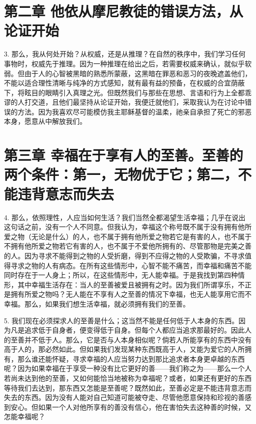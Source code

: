 
\section{第二章 他依从摩尼教徒的错误方法，从论证开始}

3. 那么，我从何处开始？从权威，还是从推理？在自然的秩序中，我们学习任何事物时，权威先于推理。因为一种推理在给出之后，若需要权威来确认，就似乎软弱。但由于人的心智被黑暗的熟悉所蒙蔽，这黑暗在罪恶和恶习的夜晚遮盖他们，不能以适合理性清晰与纯净的方式感知，就有最有益的预备，在权威的合宜荫蔽下，将眩目的眼睛引入真理之光。但既然我们与那些在思想、言语和行为上全都乖谬的人打交道，且他们最坚持从论证开始，我便迁就他们，采取我认为在讨论中错误的方法。因为我喜欢尽可能模仿我主耶稣基督的温柔，祂亲自承担了死亡的邪恶本身，愿意从中解放我们。\par


\section{第三章 幸福在于享有人的至善。至善的两个条件：第一，无物优于它；第二，不能违背意志而失去}

4. 那么，依照理性，人应当如何生活？我们当然全都渴望生活幸福；几乎在说出这句话之前，没有一个人不同意。但我认为，幸福这个称号既不属于没有拥有他所爱之物（无论是什么）的人，也不属于拥有他所爱之物若它是有害的人，也不属于不拥有他所爱之物若它有害的人，也不属于不爱他所拥有的、尽管那物是完美之善的人。因为寻求不能得到之物的人受折磨，得到不应得之物的人受欺骗，不寻求值得寻求之物的人有病态。在所有这些情形中，心智不能不痛苦，而幸福和痛苦不能同时存在于一人身上；所以，在这些情形中，无人能幸福。于是我找到第四种情形，其中幸福生活存在：当人的至善被爱且被拥有之时。因为我们所谓享乐，不正是拥有所爱之物吗？无人能在不享有人之至善的情况下幸福，也无人能享用它而不幸福。那么，如果我们想生活幸福，就必须拥有我们的至善。\par

5. 我们现在必须探求人的至善是什么；这当然不能是任何低于人本身的东西。因为凡是追求低于自身者，便变得低于自身。但每个人都应当追求那最好的。因此人的至善并不低于人。那么，它是否与人本身相似呢？倘若人所能享有的东西中没有高于人的，那必然如此。但如果我们发现某种东西既高于人，又能为爱它的人所拥有，那么谁还能怀疑，寻求幸福的人应当努力达到那比追求者本身更卓越的东西呢？因为如果幸福在于享受一种没有比它更好的善——我们称之为——那么一个人若尚未达到他的至善，又如何能恰当地被称为幸福呢？或者，如果还有更好的东西等待我们去达到，那东西又怎能是至善呢？既然如此，至善必定是不能违背意志而失去的东西。因为没有人能对自己知道可能被夺走、尽管他愿意保持和珍视的善感到安心。但如果一个人对他所享有的善没有信心，他在害怕失去这种善的时候，又怎能幸福呢？\par

